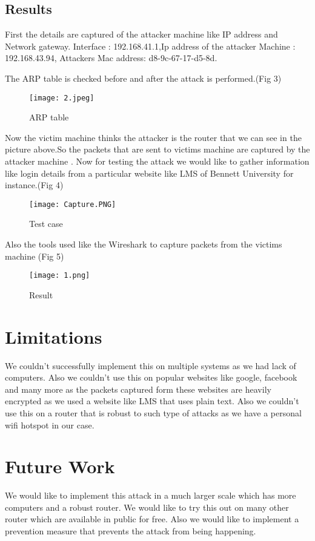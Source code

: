 \documentclass[11pt]{article}
\begin{document}
\subsection{Results}
First the details are captured of the attacker machine like IP address and Network gateway.
Interface : 192.168.41.1,Ip address of the attacker Machine : 192.168.43.94,
Attackers Mac address: d8-9c-67-17-d5-8d.

The ARP table is checked before and after the attack is performed.(Fig 3)
\begin{figure}[h!]
\centering
\texttt{[image: 2.jpeg]}
\caption{ARP table}
\label{fig:universe}
\end{figure}

Now the victim machine thinks the attacker is the router that we can see in the picture above.So the packets that are sent to victims machine are captured by the attacker machine .
Now for testing the attack we would like to gather information like login details from a particular website like LMS of Bennett University for instance.(Fig 4)

\begin{figure}[h!]
\centering
\texttt{[image: Capture.PNG]}
\caption{Test case}
\label{fig:universe}
\end{figure}


Also the tools used like the Wireshark to capture packets from the victims machine (Fig 5)

\begin{figure}[h!]
\centering
\texttt{[image: 1.png]}
\caption{Result}
\label{fig:universe}
\end{figure}

\section{Limitations}
We couldn’t successfully implement this on multiple systems as we had lack of computers. Also we couldn’t use this on popular websites like google, facebook and many more as the packets captured form these websites are heavily encrypted as we used a website like LMS that uses plain text. Also we couldn’t use this on a router that is robust to such type of attacks as we have a personal wifi hotspot in our case.
\section{Future Work}
We would like to implement this attack in a much larger scale which has more computers and a robust router. We would like to try this out on many other router which are available in public for free. Also we would like to implement a prevention measure that prevents the attack from being happening.
\end{document}
